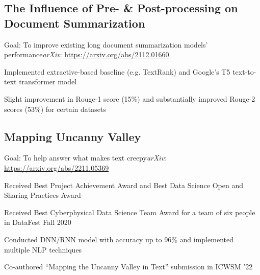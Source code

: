 \documentclass[11pt]{article}
\begin{document}
\subsection*{The Influence of Pre- \& Post-processing on Document Summarization \hfill {}}
\noindent
Goal: To improve existing long document summarization models' performance\hfill\textit{arXiv}: \href{https://arxiv.org/abs/2112.01660}{https://arxiv.org/abs/2112.01660}
\begin{compactitem}
    \item Implemented extractive-based baseline (e.g. TextRank) and Google's T5 text-to-text transformer model
    \item Slight improvement in Rouge-1 score (15\%) and substantially improved Rouge-2 scores (53\%) for certain datasets
\end{compactitem}

\subsection*{Mapping Uncanny Valley \hfill {}}
\noindent
Goal: To help answer what makes text creepy\hfill \textit{arXiv}: \href{https://arxiv.org/abs/2211.05369}{https://arxiv.org/abs/2211.05369}
\begin{compactitem}
    \item Received Best Project Achievement Award and Best Data Science Open and
    Sharing Practices Award
    \item Received Best Cyberphysical Data Science Team Award for a team of six people
    in DataFest Fall 2020
    \item Conducted DNN/RNN model with accuracy up to 96\% and implemented
    multiple NLP techniques
    \item Co-authored ``Mapping the Uncanny Valley in Text'' submission in
    ICWSM '22
\end{compactitem}
\end{document}
